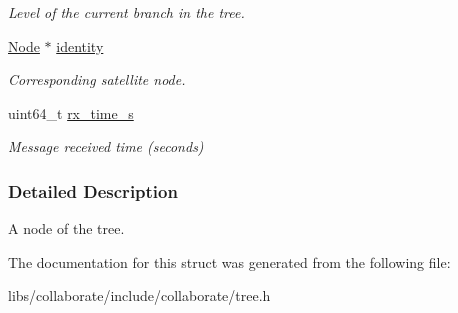 \begin{DoxyCompactItemize}
\begin{DoxyCompactList}\small\item\em Level of the current branch in the tree. \end{DoxyCompactList}\item 
\mbox{\label{structosse_1_1collaborate_1_1_tree_1_1_branch_ad91a67cf892b961fdfaf2fd2351166b9}} 
\hyperlink{classosse_1_1collaborate_1_1_node}{Node} $\ast$ \hyperlink{structosse_1_1collaborate_1_1_tree_1_1_branch_ad91a67cf892b961fdfaf2fd2351166b9}{identity}
\begin{DoxyCompactList}\small\item\em Corresponding satellite node. \end{DoxyCompactList}\item 
\mbox{\label{structosse_1_1collaborate_1_1_tree_1_1_branch_aea50b889decbfbf82feb1298e3f73d5f}} 
uint64\+\_\+t \hyperlink{structosse_1_1collaborate_1_1_tree_1_1_branch_aea50b889decbfbf82feb1298e3f73d5f}{rx\+\_\+time\+\_\+s}
\begin{DoxyCompactList}\small\item\em Message received time (seconds) \end{DoxyCompactList}\end{DoxyCompactItemize}


\subsubsection{Detailed Description}
A node of the tree. 

The documentation for this struct was generated from the following file\+:\begin{DoxyCompactItemize}
\item 
libs/collaborate/include/collaborate/tree.\+h\end{DoxyCompactItemize}
